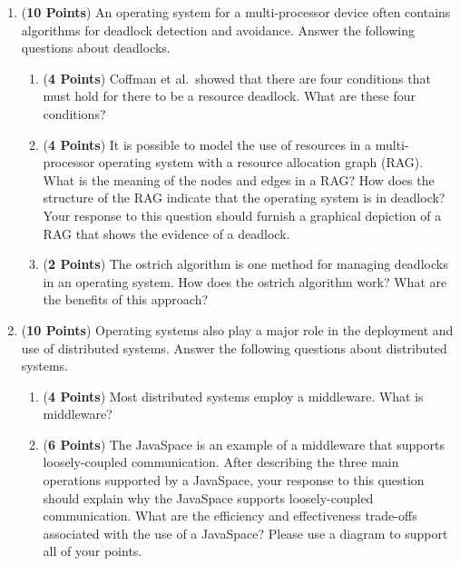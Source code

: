 \documentclass[12pt,epsf,psfig,graphics]{article}
\begin{document}
\begin{enumerate}
\begin{enumerate}
  \end{enumerate}

  \newpage

\item ({\bf 10 Points}) An operating system for a multi-processor device often contains algorithms for deadlock
  detection and avoidance.  Answer the following questions about deadlocks.

  \begin{enumerate}

    \item ({\bf 4 Points}) Coffman et al.\ showed that there are four conditions that must hold for there to be a
      resource deadlock. What are these four conditions?

    \item ({\bf 4 Points}) It is possible to model the use of resources in a multi-processor operating system with a
      resource allocation graph (RAG).  What is the meaning of the nodes and edges in a RAG?  How does the structure of
      the RAG indicate that the operating system is in deadlock? Your response to this question should furnish a
      graphical depiction of a RAG that shows the evidence of a deadlock.

    \item ({\bf 2 Points}) The ostrich algorithm is one method for managing deadlocks in an operating system.  How does
      the ostrich algorithm work? What are the benefits of this approach?

  \end{enumerate}

  \newpage

\item ({\bf 10 Points}) Operating systems also play a major role in the deployment and use of distributed systems.
  Answer the following questions about distributed systems.

  \begin{enumerate}

    \item ({\bf 4 Points}) Most distributed systems employ a middleware.  What is middleware?

    \item ({\bf 6 Points}) The JavaSpace is an example of a middleware that supports loosely-coupled communication.
      After describing the three main operations supported by a JavaSpace, your response to this question should explain
      why the JavaSpace supports loosely-coupled communication. What are the efficiency and effectiveness trade-offs
      associated with the use of a JavaSpace? Please use a diagram to support all of your points.

  \end{enumerate}

\end{enumerate}
\end{document}
